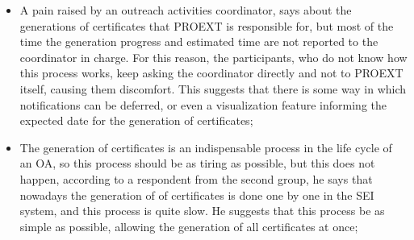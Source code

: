 \begin{itemize}

\item A pain raised by an outreach activities coordinator, says about the generations of certificates that \ac{PROEXT} is responsible for, but most of the time the generation progress and estimated time are not reported to the coordinator in charge. For this reason, the participants, who do not know how this process works, keep asking the coordinator directly and not to \ac{PROEXT} itself, causing them discomfort. This suggests that there is some way in which notifications can be deferred, or even a visualization feature informing the expected date for the generation of certificates;


\item The generation of certificates is an indispensable process in the life cycle of an \acl{OA}, so this process should be as tiring as possible, but this does not happen, according to a respondent from the second group, he says that nowadays the generation of of certificates is done one by one in the \ac{SEI} system, and this process is quite slow. He suggests that this process be as simple as possible, allowing the generation of all certificates at once;


\end{itemize}
